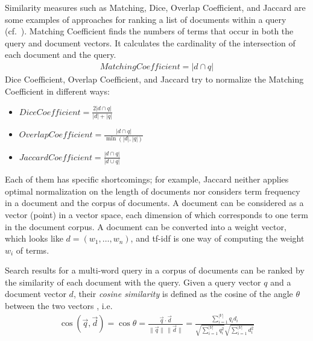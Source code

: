 \documentclass{IOS-Book-Article}
\begin{document}
Similarity measures such as Matching, Dice, Overlap Coefficient, and Jaccard are some examples of approaches for ranking a list of documents within a query (cf.~\citet{ChristopherD1999}).
Matching Coefficient finds the numbers of terms that occur in both the query and document vectors.
It calculates the cardinality of the intersection of each document and the query.
\begin{align*}
\mathit{Matching Coefficient}=|d\cap q|
\end{align*}
Dice Coefficient, Overlap Coefficient, and Jaccard try to normalize the Matching Coefficient in different ways:
\begin{itemize}
	\item $\mathit{Dice Coefficient}=\frac{2|d\cap q|}{|d|+|q|}$
	\item $\mathit{Overlap Coefficient}=\frac{|d\cap q|}{\min(|d|,|q|)}$
	\item $\mathit{Jaccard Coefficient}=\frac{|d\cap q|}{|d\cup q|}$
\end{itemize}
Each of them has specific shortcomings;
for example, Jaccard neither applies optimal normalization on the length of documents nor considers term frequency in a document and the corpus of documents.
A document can be considered as a vector (point) in a vector space, each dimension of which corresponds to one term in the document corpus. 
A document can be converted into a weight vector, which looks like $d=(w_1,\dots,w_n)$, and tf-idf is one way of computing the weight $w_i$ of terms.

Search results for a multi-word query in a corpus of documents can be ranked by the similarity of each document with the query.
Given a query vector $q$ and a document vector $d$, their \emph{cosine similarity} is defined as the cosine of the angle $\theta$ between the two vectors \citep{SALTON1988,ChristopherD1999}, i.e.\
\begin{align*}
  \cos(\overrightarrow{q},\overrightarrow{d})=\cos \theta=\frac{\overrightarrow{q}\cdot \overrightarrow{d}}{\|\overrightarrow{q}\|\,\|\overrightarrow{d}\|}=
  \frac{\sum_{i=1}^{|V|} q_id_i}{\sqrt{\sum_{i=1}^{|V|} q_i^2}\sqrt{\sum_{i=1}^{|V|} d_i^2}}
\end{align*}
\end{document}
